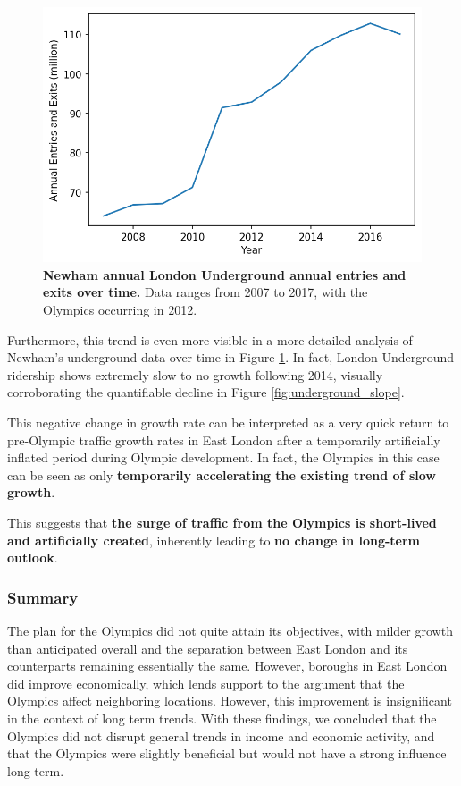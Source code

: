 \documentclass[11pt, twocolumn]{article}
\begin{document}
\begin{enumerate}
    \begin{figure}[H]
        \centering
            \includegraphics[scale=0.5]{newham_activity.png}
        \caption{\textbf{Newham annual London Underground annual entries and exits over time.} Data ranges from 2007 to 2017, with the Olympics occurring in 2012.}
        \label{fig:newham_activity}
    \end{figure}
    
    Furthermore, this trend is even more visible in a more detailed analysis of Newham's underground data over time in Figure \ref{fig:newham_activity}. In fact, London Underground ridership shows extremely slow to no growth following 2014, visually corroborating the quantifiable decline in Figure \ref{fig:underground_slope}.
    
    This negative change in growth rate can be interpreted as a very quick return to pre-Olympic traffic growth rates in East London after a temporarily artificially inflated period during Olympic development. In fact, the Olympics in this case can be seen as only \textbf{temporarily accelerating the existing trend of slow growth}.
    
    This suggests that \textbf{the surge of traffic from the Olympics is short-lived and artificially created}, inherently leading to \textbf{no change in long-term outlook}.
\end{enumerate}
    
\subsubsection{Summary}
The plan for the Olympics did not quite attain its objectives, with milder growth than anticipated overall and the separation between East London and its counterparts remaining essentially the same. However, boroughs in East London did improve economically, which lends support to the argument that the Olympics affect neighboring locations. However, this improvement is insignificant in the context of long term trends. With these findings, we concluded that the Olympics did not disrupt general trends in income and economic activity, and that the Olympics were slightly beneficial but would not have a strong influence long term.
\end{document}
